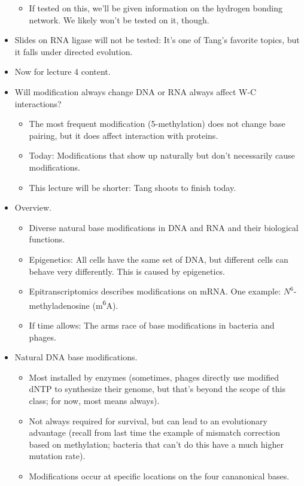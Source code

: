 \documentclass[../notes.tex]{subfiles}
\begin{document}
\begin{itemize}
\begin{itemize}
        \item If tested on this, we'll be given information on the hydrogen bonding network. We likely won't be tested on it, though.
    \end{itemize}
    \item Slides on RNA ligase will not be tested: It's one of Tang's favorite topics, but it falls under directed evolution.
    \item Now for lecture 4 content.
    \item Will modification always change DNA or RNA always affect W-C interactions?
    \begin{itemize}
        \item The most frequent modification (5-methylation) does not change base pairing, but it does affect interaction with proteins.
        \item Today: Modifications that show up naturally but don't necessarily cause modifications.
        \item This lecture will be shorter: Tang shoots to finish today.
    \end{itemize}
    \item Overview.
    \begin{itemize}
        \item Diverse natural base modifications in DNA and RNA and their biological functions.
        \item Epigenetics: All cells have the same set of DNA, but different cells can behave very differently. This is caused by epigenetics.
        \item Epitranscriptomics describes modifications on mRNA. One example: $N^6$-methyladenosine (m\textsuperscript{6}A).
        \item If time allows: The arms race of base modifications in bacteria and phages.
    \end{itemize}
    \item Natural DNA base modifications.
    \begin{itemize}
        \item Most installed by enzymes (sometimes, phages directly use modified dNTP to synthesize their genome, but that's beyond the scope of this class; for now, most means always).
        \item Not always required for survival, but can lead to an evolutionary advantage (recall from last time the example of mismatch correction based on methylation; bacteria that can't do this have a much higher mutation rate).
        \item Modifications occur at specific locations on the four cananonical bases.

\end{itemize}
\end{itemize}
\end{document}
